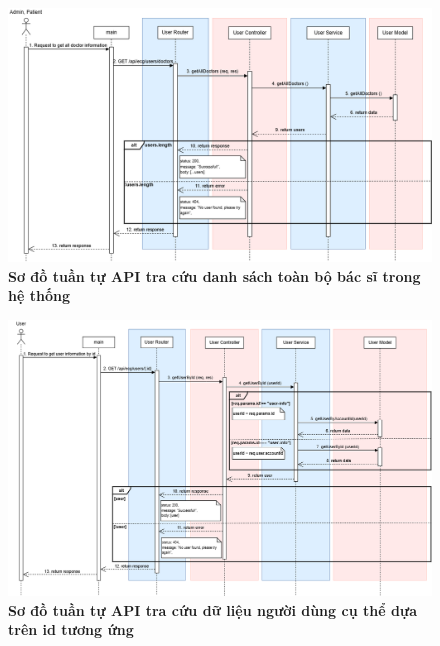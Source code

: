\begin{figure}[H]
	\centering
	\includegraphics[width=16cm]{Images/api_sequence/user/getAllDoctors.drawio.png}
	\caption[Sơ đồ tuần tự API tra cứu danh sách toàn bộ bác sĩ trong hệ thống]{\bfseries \fontsize{12pt}{0pt}\selectfont Sơ đồ tuần tự API tra cứu danh sách toàn bộ bác sĩ trong hệ thống}
	\label{sequence_diagram_get_all_doctors}
\end{figure}

\begin{figure}[H]
	\centering
	\includegraphics[width=16cm]{Images/api_sequence/user/getUserById.drawio.png}
	\caption[Sơ đồ tuần tự API tra cứu dữ liệu người dùng cụ thể dựa trên id tương ứng]{\bfseries \fontsize{12pt}{0pt}\selectfont Sơ đồ tuần tự API tra cứu dữ liệu người dùng cụ thể dựa trên id tương ứng}
	\label{sequence_diagram_get_user_by_id}
\end{figure}

